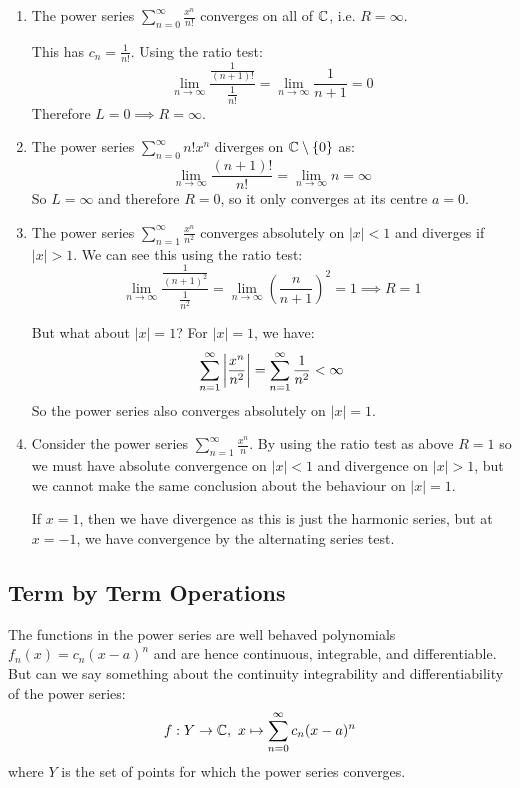 \documentclass[../main.tex]{subfiles}
\begin{document}
\begin{example} \label{rConvExamples}
  \begin{enumerate}
    \item The power series $\sum_{n = 0}^{\infty} \frac{x^{n}}{n!}$ converges on all of $\mathbb{C}$, i.e. $R = \infty$.

      This has $c_n = \frac{1}{n!}$.
      Using the ratio test:
      \[
        \lim_{n \to \infty} \frac{\frac{1}{(n + 1)!}}{\frac{1}{n!}} = \lim_{n \to \infty} \frac{1}{n + 1} = 0
      \]
      Therefore $L = 0 \implies R = \infty$.
    \item The power series $\sum_{n = 0}^{\infty} n! x^{n}$ diverges on $\mathbb{C} \setminus \{0\}$ as:
      \[
        \lim_{n \to \infty} \frac{(n + 1)!}{n!} = \lim_{n \to \infty} n = \infty
      \]
      So $L = \infty$ and therefore $R = 0$, so it only converges at its centre $a = 0$.
    \item The power series $\sum_{n = 1}^{\infty} \frac{x^{n}}{n^2}$ converges absolutely on $|x| < 1$ and diverges if $|x| > 1$.
      We can see this using the ratio test:
      \[
        \lim_{n \to \infty} \frac{\frac{1}{(n + 1)^2}}{\frac{1}{n^2}} = \lim_{n \to \infty} \left(\frac{n}{n + 1}\right)^2= 1 \implies R = 1
      \]

      But what about $|x| = 1$?
      For $|x| = 1$, we have:
      \[
        \sum_{n = 1}^{\infty} \left\lvert \frac{x^{n}}{n^2} \right\rvert = \sum_{n = 1}^{\infty} \frac{1}{n^2} < \infty
      \]
      So the power series also converges absolutely on $|x| = 1$.
    \item Consider the power series $\sum_{n = 1}^{\infty} \frac{x^{n}}{n}$.
      By using the ratio test as above $R = 1$ so we must have absolute convergence on $|x| < 1$ and divergence on $|x| > 1$, but we cannot make the same conclusion about the behaviour on $|x| = 1$.

      If $x = 1$, then we have divergence as this is just the harmonic series, but at $x = -1$, we have convergence by the alternating series test.
  \end{enumerate}
\end{example}
\subsection{Term by Term Operations}
The functions in the power series are well behaved polynomials $f_n(x) = c_n(x - a)^{n}$ and are hence continuous, integrable, and differentiable.
But can we say something about the continuity integrability and differentiability of the power series:
\[
  f: Y \to \mathbb{C},\ x \mapsto \sum_{n = 0}^{\infty} c_n(x - a)^{n}
\]
where $Y$ is the set of points for which the power series converges.
\end{document}
